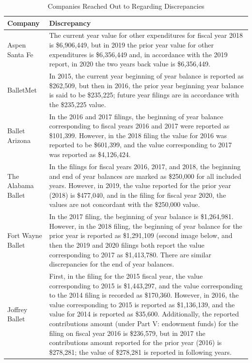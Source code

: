 \documentclass[Dance Data
Project,article,submit,moreauthors,pdftex]{mdpi}
\begin{document}
\begin{table}[!h]

\caption{\label{tab:unnamed-chunk-1}\label{table:discrep}Companies Reached Out to Regarding Discrepancies}
\centering
\begin{tabular}[t]{l>{\raggedright\arraybackslash}p{35em}}
\toprule
Company & Discrepancy\\
\midrule
Aspen Santa Fe & The current year value for other expenditures for fiscal year 2018 is \$6,906,449, but in 2019 the prior year value for other expenditures is \$6,356,449 and, in accordance with the 2019 report, in 2020 the two years back value is \$6,356,449.\\
\addlinespace
BalletMet & In 2015, the current year beginning of year balance is reported as \$262,509, but then in 2016, the prior year beginning year balance is said to be \$235,225; future year filings are in accordance with the \$235,225 value.\\
\addlinespace
Ballet Arizona & In the 2016 and 2017 filings, the beginning of year balance corresponding to fiscal years 2016 and 2017 were reported as \$101,399. However, in the 2018 filing the value for 2016 was reported to be \$601,399, and the value corresponding to 2017 was reported as \$4,126,424.\\
\addlinespace
The Alabama Ballet & In the filings for fiscal years 2016, 2017, and 2018,  the beginning and end of year balances are marked as \$250,000 for all included years. However, in 2019, the value reported for the prior year (2018)  is \$477,040, and in the filing for fiscal year 2020, the values are not concordant with the \$250,000 value.\\
\addlinespace
Fort Wayne Ballet & In the 2017 filing, the beginning of year balance is \$1,264,981. However, in the 2018 filing, the beginning of year balance for the prior year is reported as \$1,291,109 (second image below, and then the 2019 and 2020 filings both report the value corresponding to 2017 as \$1,413,780. There are similar discrepancies for the end of year balances.\\
\addlinespace
Joffrey Ballet & First, in the filing for the 2015 fiscal year, the value corresponding to 2015 is \$1,443,297, and the value corresponding to the 2014 filing is recorded as \$170,360.  However, in 2016, the value corresponding to 2015 is reported as \$1,136,139, and the value for 2014 is reported as \$35,600. Additionally, the reported contributions amount (under Part V: endowment funds)  for the filing on fiscal year 2016 is \$236,579, but in 2017 the contributions amount reported for the prior year (2016) is \$278,281; the value of \$278,281 is reported in following years.\\

\end{tabular}
\end{table}
\end{document}

